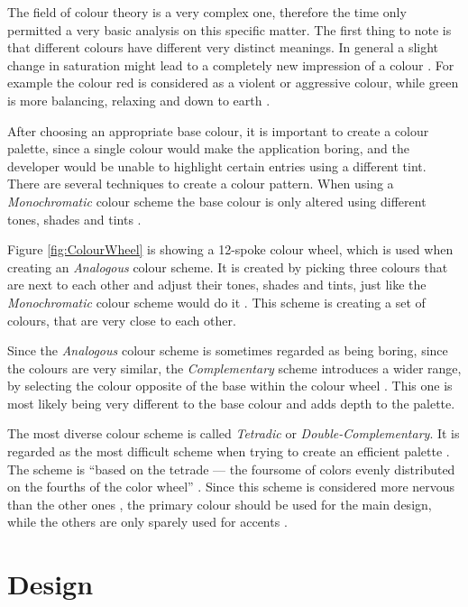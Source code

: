 The field of colour theory is a very complex one, therefore the time only permitted a very basic analysis on this specific matter. The first thing to note is that different colours have different very distinct meanings. In general a slight change in saturation might lead to a completely new impression of a colour \cite{Chapman:2010aa}. For example the colour red is considered as a violent or aggressive colour, while green is more balancing, relaxing and down to earth \cite{Chapman:2010aa}.

After choosing an appropriate base colour, it is important to create a colour palette, since a single colour would make the application boring, and the developer would be unable to highlight certain entries using a different tint. There are several techniques to create a colour pattern. When using a \emph{Monochromatic} colour scheme the base colour is only altered using different tones, shades and tints \cite{Chapman:2010ab}. 


Figure \vref{fig:ColourWheel} is showing a 12-spoke colour wheel, which is used when creating an \emph{Analogous} colour scheme. It is created by picking three colours that are next to each other and adjust their tones, shades and tints, just like the \emph{Monochromatic} colour scheme would do it \cite{Chapman:2010ab}. This scheme is creating a set of colours, that are very close to each other.

Since the \emph{Analogous} colour scheme is sometimes regarded as being boring, since the colours are very similar, the \emph{Complementary} scheme introduces a wider range, by selecting the colour opposite of the base within the colour wheel \cite{Chapman:2010ab}. This one is most likely being very different to the base colour and adds depth to the palette.

The most diverse colour scheme is called \emph{Tetradic} or \emph{Double-Complementary}. It is regarded as the most difficult scheme when trying to create an efficient palette \cite{Chapman:2010ab}. The scheme is \enquote{based on the tetrade — the foursome of colors evenly distributed on the fourths of the color wheel} \cite{Stanicek:2011aa}. Since this scheme is considered more nervous than the other ones \cite{Stanicek:2011aa}, the primary colour should be used for the main design, while the others are only sparely used for accents \cite{Chapman:2010ab}.

\chapter{Design}
\label{chapter:Design}

